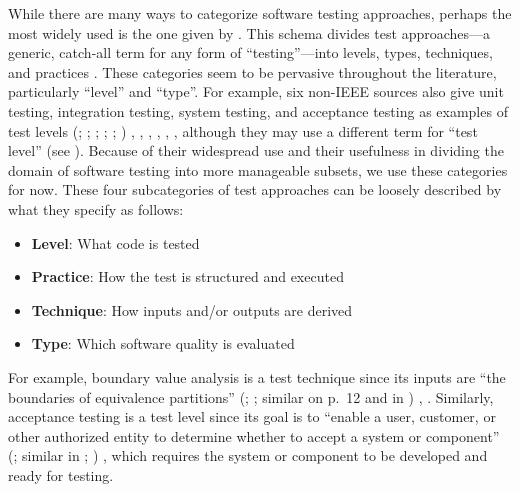 While there are many ways to categorize software testing approaches, perhaps
the most widely used is the one given by \ifnotpaper\else \citeauthor{IEEE2022}
\fi \citet{IEEE2022}. This schema divides test approaches---a generic, catch-all
term for any form of ``testing''---into levels, types, techniques, and practices
\citeyearpar[Fig.~2; see ]{IEEE2022}. These categories seem
to be pervasive throughout the literature, particularly ``level'' and ``type''.
\label{nonIEEE-sources}%
For example, six non-IEEE sources also give unit testing, integration testing,
system testing, and acceptance testing as examples of test levels \ifnotpaper
    (\citealp[pp.~5\=/6 to 5\=/7]{SWEBOK2024}; \citealpISTQB{};
    \citealp[pp.~807\==808]{Perry2006}; \citealp[pp.~443\==445]{PetersAndPedrycz2000};
    \citealp[p.~218]{KuļešovsEtAl2013};
    \citealp[pp.~9, 13]{Gerrard2000a})\else
    \cite[pp.~443\==445]{PetersAndPedrycz2000},
    \cite[pp.~5\=/6 to 5\=/7]{SWEBOK2024}, \cite{ISTQB},
    \cite[pp.~807\==808]{Perry2006}, \cite[pp.~9, 13]{Gerrard2000a},
    \cite[p.~218]{KuļešovsEtAl2013}\fi,
although they may use a different term for ``test
level'' (see ). Because of their widespread use and
their usefulness in dividing the domain of software testing into more
manageable subsets, we use these categories for now. These four subcategories
of test approaches can be loosely described by what they specify as
follows:
\begin{itemize}
    \item \textbf{Level}: What code is tested
    \item \textbf{Practice}: How the test is structured and executed
    \item \textbf{Technique}: How inputs and/or outputs are derived
    \item \textbf{Type}: Which software quality is evaluated
\end{itemize}
For example, boundary value analysis is a test technique since its inputs are
``the boundaries of equivalence partitions'' \ifnotpaper
    (\citealp[p.~2]{IEEE2022}; \citeyear[p.~1]{IEEE2021}; similar on p.~12 and
    in \citealpISTQB{})%
\else
    \cite[p.~2]{IEEE2022}, \cite[p.~1]{IEEE2021}%
\fi. Similarly, acceptance testing is a test level since its goal is to
``enable a user, customer, or other authorized entity to determine whether to
accept a system or component'' \ifnotpaper (\citealp[p.~5]{IEEE2017}; similar
    in \citeyear[p.~6]{IEEE2021}; \citealp[p.~344]{SakamotoEtAl2013})\else
    \cite[p.~5]{IEEE2017}\fi, which requires the system or component to be
developed and ready for testing.

